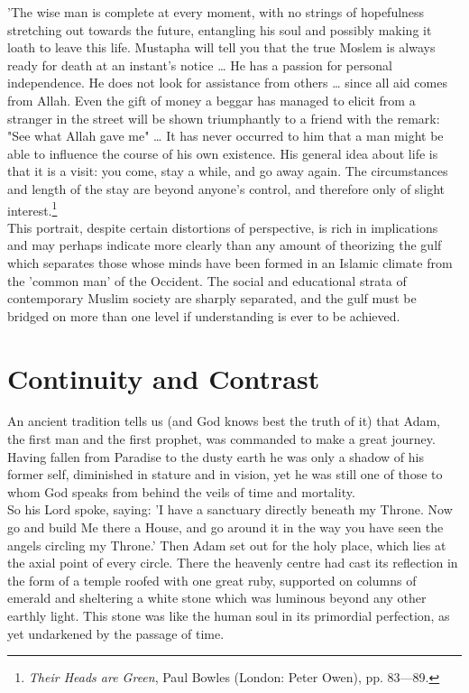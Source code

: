 \documentclass[11pt, b5paper, twoside]{book}
\begin{document}
'The wise man is complete at every moment, with no strings of hopefulness stretching out towards the future, entangling his soul and possibly making it loath to leave this life. Mustapha will tell you that the true Moslem is always ready for death at an instant's notice \ldots{} He has a passion for personal independence. He does not look for assistance from others \ldots{} since all aid comes from Allah. Even the gift of money a beggar has managed to elicit from a stranger in the street will be shown triumphantly to a friend with the remark: "See what Allah gave me" \ldots{} It has never occurred to him that a man might be able to influence the course of his own existence. His general idea about life is that it is a visit: you come, stay a while, and go away again. The circumstances and length of the stay are beyond anyone's control, and therefore only of slight interest.\footnote{\emph{Their Heads are Green}, Paul Bowles (London: Peter Owen), pp. 83---89.}\\

This portrait, despite certain distortions of perspective, is rich in implications and may perhaps indicate more clearly than any amount of theorizing the gulf which separates those whose minds have been formed in an Islamic climate from the 'common man' of the Occident. The social and educational strata of contemporary Muslim society are sharply separated, and the gulf must be bridged on more than one level if understanding is ever to be achieved. \\

\chapter{Continuity and Contrast}

An ancient tradition tells us (and God knows best the truth of it) that Adam, the first man and the 
first prophet, was commanded to make a great journey. Having fallen from Paradise to the dusty earth 
he was only a shadow of his former self, diminished in stature and in vision, yet he was still one of 
those to whom God speaks from behind the veils of time and mortality. \\

So his Lord spoke, saying: 'I have a sanctuary directly beneath my Throne. Now go and build Me there 
a House, and go around it in the way you have seen the angels circling my Throne.' Then Adam set out 
for the holy place, which lies at the axial point of every circle. There the heavenly centre had cast 
its reflection in the form of a temple roofed with one great ruby, supported on columns of emerald 
and sheltering a white stone which was luminous beyond any other earthly light. This stone was like 
the human soul in its primordial perfection, as yet undarkened by the passage of time. \\
\end{document}
